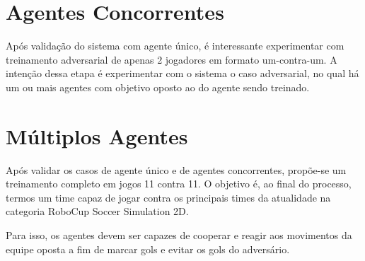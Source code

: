 \section{Agentes Concorrentes}

Após validação do sistema com agente único, é interessante experimentar com treinamento adversarial de apenas 2 jogadores em formato um-contra-um. A intenção dessa etapa é experimentar com o sistema o caso adversarial, no qual há um ou mais agentes com objetivo oposto ao do agente sendo treinado.

\section{Múltiplos Agentes}

Após validar os casos de agente único e de agentes concorrentes, propõe-se um treinamento completo em jogos 11 contra 11. O objetivo é, ao final do processo, termos um time capaz de jogar contra os principais times da atualidade na categoria RoboCup Soccer Simulation 2D.

Para isso, os agentes devem ser capazes de cooperar e reagir aos movimentos da equipe oposta a fim de marcar gols e evitar os gols do adversário.



